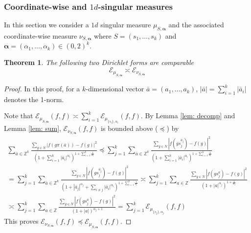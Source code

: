 \documentclass[pdflatex,sn-mathphys-num]{sn-jnl}%
\theoremstyle{thmstyleone}%
\newtheorem{theo}{Theorem}%
\theoremstyle{thmstyletwo}%
\theoremstyle{thmstylethree}%
\begin{document}
\subsubsection{Coordinate-wise and $1d$-singular measures}
In this section we consider a $1d$ singular measure $\mu_{S,\bm{\alpha}}$ and the associated coordinate-wise measure $\nu_{S,\bm{\alpha}}$ where 
 $S=(s_1,\dots, s_k)$ and $\bm{\alpha}=(\alpha_1,\dots,\alpha_k) \in (0,2)^k$. 

\begin{theo}
\label{thm: coord}
  The following two Dirichlet forms are comparable  $$\mathcal{E}_{\mu_{S,\bm{\alpha}}} \asymp  \mathcal{E}_{\nu_{S, \bm{\alpha}}}$$
\end{theo}
\begin{proof} In this proof,  for a $k$-dimensional vector $\bar{a}=(a_1,\dots,a_k)$, $|\bar{a}|= \sum_{i=1}^k |\bar{a}_i|$ denotes the 1-norm.

Note that 
$\mathcal{E}_{\mu_{S,\bm{\alpha}}}  (f,f)  \asymp \sum_{i=1}^k \mathcal{E}_{\mu_{\{s_i\},\alpha_i}}(f,f) $. By Lemma \ref{lem: decomp} and Lemma \ref{lem: sum}, 
$ \mathcal{E}_{\nu_{S, \bm{\alpha}} }(f,f)$ is bounded above ($\preccurlyeq$) by
    \begin{align*}
          \sum_{\bar{a}\in \mathbb{Z}^k} \frac{ \sum_{g\in N}|f(g \pi(\bar{a})) - f(g)|^2 }{ \left(1+ \sum_{i=1}^k |\bar{a}_i|^{\alpha_i}\right)^{1+ \sum_{i=1}^k \frac{1}{\alpha_i}} }
         \preccurlyeq   \sum_{j=1}^k  \sum_{\bar{a}\in \mathbb{Z}^k}
        \frac{ \sum_{g\in N} |f(g s_j^{\bar{a}_j}) - f(g)|^2 }{ \left(1+ \sum_{i=1}^k |\bar{a}_i|^{\alpha_i}\right)^{1 + \sum_{i=1}^k \frac{1}{\alpha_i}} } \\
          = \sum_{j=1}^k  \sum_{
      \bar{a}\in \mathbb{Z}^k
     }
        \frac{  \sum_{g\in N} |f(g s_j^{\bar{a}_j}) - f(g)|^2 }{(1 + |\bar{a}_j|^{\alpha_j} + \sum_{i\ne j}|\bar{a}_i|^{\alpha_i}
        )^{1 + \sum_{i=1}^k \frac{1}{\alpha_i}}}
        \asymp \sum_{j=1}^k  \sum_{
       a \in \mathbb{Z} }
        \frac{ \sum_{g\in N} |f(g s_j^{a}) - f(g)|^2 }{(1 + |a|^{\alpha_j})^{1 + \frac{1}{\alpha_j}}}  \\
         \asymp  \sum_{j=1}^k  \sum_{
       a \in \mathbb{Z} }
        \frac{ \sum_{g\in N} |f(g s_j^{a}) - f(g)|^2 }{(1 + |a|)^{\alpha_j + 1}}  
         = \sum_{j=1}^k 
 \mathcal{E}_{\mu_{\{s_j\},\alpha_j}}(f,f) 
    \end{align*}
This proves 
 $\mathcal{E}_{\nu_{S, \bm{\alpha}}}(f,f) \preccurlyeq \mathcal{E}_{\mu_{S, \bm{\alpha}}}(f,f)$. 



\end{proof}
\end{document}
